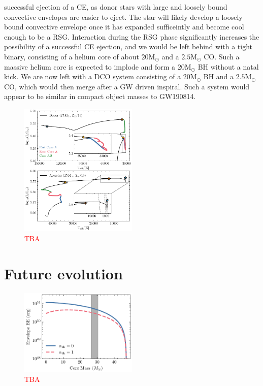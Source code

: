 \documentclass[linenumbers,trackchanges,twocolumn]{aastex701}
\newcommand{\Mdot}{\mathrm{M}_{\odot}}
\newcommand{\red}{\textcolor{red}}
\begin{document}
successful ejection of a CE, as donor stars with large and loosely bound convective envelopes are easier to eject. The star will likely develop a loosely bound convective envelope once it has expanded sufficeintly and become cool enough to be a RSG. Interaction during the RSG phase significantly increases the possibility of a successful CE ejection, and we would be left behind with a tight binary, consisting of a helium core of about $20\Mdot$ and a $2.5\Mdot$ CO. Such a massive helium core is expected to implode and form a $20\Mdot$ BH without a natal kick. We are now left with a DCO system consisting of a $20\Mdot$ BH and a $2.5\Mdot$ CO, which would then merge after a GW driven inspiral. Such a system would appear to be similar in compact object masses to GW190814. 

\begin{figure}[htbp]
    \centering
    \includegraphics[width=0.5\textwidth]{gw_fiducial_hr.pdf}
    \caption{\red{TBA}}
    \label{fig:gw_hr}
\end{figure}

\section{Future evolution}

\begin{figure}[htbp]
    \centering
    \includegraphics[width=0.5\textwidth]{xrb_be.pdf}
    \caption{\red{TBA}}
    \label{fig:xrb_be}
\end{figure}
\end{document}
